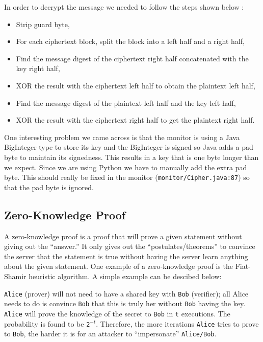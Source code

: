 \documentclass[10pt]{article}
\begin{document}
In order to decrypt the message we needed to follow the steps shown below \cite{karn}:
\begin{itemize}
    \item Strip guard byte,
    \item For each ciphertext block, split the block into a left half and a
          right half,
    \item Find the message digest of the ciphertext right half concatenated
          with the key right half,
    \item XOR the result with the ciphertext left half to obtain the plaintext
          left half,
    \item Find the message digest of the plaintext left half and the key left
          half,
    \item XOR the result with the ciphertext right half to get the plaintext
          right half.
\end{itemize}

One interesting problem we came across is that the monitor is using a Java
BigInteger type to store its key and the BigInteger is signed so Java adds a
pad byte to maintain its signedness. This results in a key that is one byte
longer than we expect. Since we are using Python we have to manually add the
extra pad byte. This should really be fixed in the monitor
(\texttt{monitor/Cipher.java:87}) so that the pad byte is ignored.

\newpage
\subsection{Zero-Knowledge Proof}
A zero-knowledge proof is a proof that will prove a given statement
without giving out the ``answer.'' It only gives out the
``postulates/theorems'' to convince the server that the statement is true
without having the server learn anything about the given statement. One example
of a zero-knowledge proof is the Fiat-Shamir heuristic algorithm. A simple example
can be descibed below:

\texttt{Alice} (prover) will not need to have a shared key with \texttt{Bob}
(verifier); all Alice needs to do is convince \texttt{Bob} that this is truly
her without \texttt{Bob} having the key. \texttt{Alice} will prove the
knowledge of the secret to \texttt{Bob} in \texttt{t} executions. The
probability is found to be \texttt{2$^{-t}$}. Therefore, the more iterations
\texttt{Alice} tries to prove to \texttt{Bob}, the harder it is for an attacker
to ``impersonate'' \texttt{Alice/Bob}.
\end{document}

